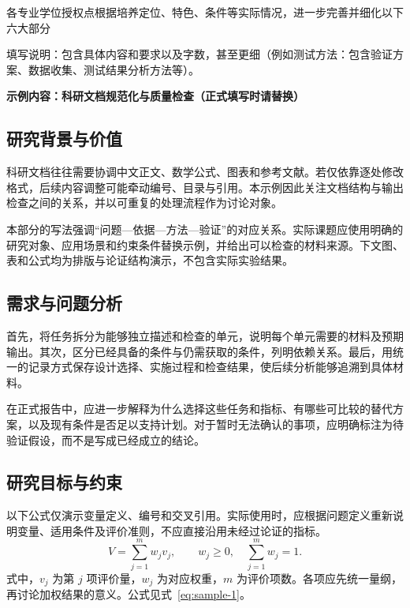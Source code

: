 {\fontsize{18bp}{23.4bp}\selectfont\color{red}各专业学位授权点根据培养定位、特色、条件等实际情况，进一步完善并细化以下六大部分\par}
\medskip
{\fontsize{15bp}{20bp}\selectfont 填写说明：包含具体内容和要求以及字数，甚至更细（例如测试方法：包含验证方案、数据收集、测试结果分析方法等）。\par}
\medskip
\noindent\textbf{示例内容：科研文档规范化与质量检查（正式填写时请替换）}\par

\subsection{研究背景与价值}
科研文档往往需要协调中文正文、数学公式、图表和参考文献。若仅依靠逐处修改格式，后续内容调整可能牵动编号、目录与引用。本示例因此关注文档结构与输出检查之间的关系，并以可重复的处理流程作为讨论对象。

本部分的写法强调“问题—依据—方法—验证”的对应关系。实际课题应使用明确的研究对象、应用场景和约束条件替换示例，并给出可以检查的材料来源。下文图、表和公式均为排版与论证结构演示，不包含实际实验结果。

\subsection{需求与问题分析}
首先，将任务拆分为能够独立描述和检查的单元，说明每个单元需要的材料及预期输出。其次，区分已经具备的条件与仍需获取的条件，列明依赖关系。最后，用统一的记录方式保存设计选择、实施过程和检查结果，使后续分析能够追溯到具体材料。

在正式报告中，应进一步解释为什么选择这些任务和指标、有哪些可比较的替代方案，以及现有条件是否足以支持计划。对于暂时无法确认的事项，应明确标注为待验证假设，而不是写成已经成立的结论。

\subsection{研究目标与约束}
以下公式仅演示变量定义、编号和交叉引用。实际使用时，应根据问题定义重新说明变量、适用条件及评价准则，不应直接沿用未经过论证的指标。
\begin{equation}\label{eq:sample-1}
V=\sum_{j=1}^{m}w_jv_j,\qquad w_j\geq0,\quad\sum_{j=1}^{m}w_j=1.
\end{equation}
式中，$v_j$ 为第 $j$ 项评价量，$w_j$ 为对应权重，$m$ 为评价项数。各项应先统一量纲，再讨论加权结果的意义。公式见式~\eqref{eq:sample-1}。


